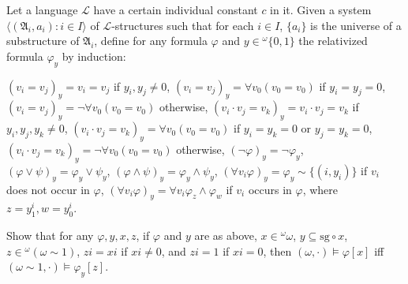 Let a language $\mathcal{L}$ have a certain individual constant $c$ in it. Given a system $\langle (\mathfrak{A}_i, a_i) : i \in I \rangle$ of $\mathcal{L}$-structures such that for each $i \in I$, $\{a_i\}$ is the universe of a substructure of $\mathfrak{A}_i$, define for any formula $\varphi$ and $y \in {}^{\omega}\{0,1\}$ the relativized formula $\varphi_y$ by induction:

$(v_i = v_j)_y = v_i = v_j$ if $y_i, y_j \neq 0$,
$(v_i = v_j)_y = \forall v_0(v_0 = v_0)$ if $y_i = y_j = 0$,
$(v_i = v_j)_y = \neg \forall v_0(v_0 = v_0)$ otherwise,
$(v_i \cdot v_j = v_k)_y = v_i \cdot v_j = v_k$ if $y_i, y_j, y_k \neq 0$,
$(v_i \cdot v_j = v_k)_y = \forall v_0(v_0 = v_0)$ if $y_i = y_k = 0$ or $y_j = y_k = 0$,
$(v_i \cdot v_j = v_k)_y = \neg \forall v_0(v_0 = v_0)$ otherwise,
$(\neg \varphi)_y = \neg \varphi_y$, $(\varphi \vee \psi)_y = \varphi_y \vee \psi_y$, $(\varphi \wedge \psi)_y = \varphi_y \wedge \psi_y$,
$(\forall v_i \varphi)_y = \varphi_y \sim \{(i, y_i)\}$ if $v_i$ does not occur in $\varphi$,
$(\forall v_i \varphi)_y = \forall v_i \varphi_z \wedge \varphi_w$ if $v_i$ occurs in $\varphi$, where $z = y_1^i, w = y_0^i$.

Show that for any $\varphi, y, x, z$, if $\varphi$ and $y$ are as above, $x \in {}^{\omega}\omega$, $y \subseteq \text{sg} \circ x$, $z \in {}^{\omega}(\omega \sim 1)$, $zi = xi$ if $xi \neq 0$, and $zi = 1$ if $xi = 0$, then $(\omega, \cdot) \models \varphi[x]$ iff $(\omega \sim 1, \cdot) \models \varphi_y[z]$.
